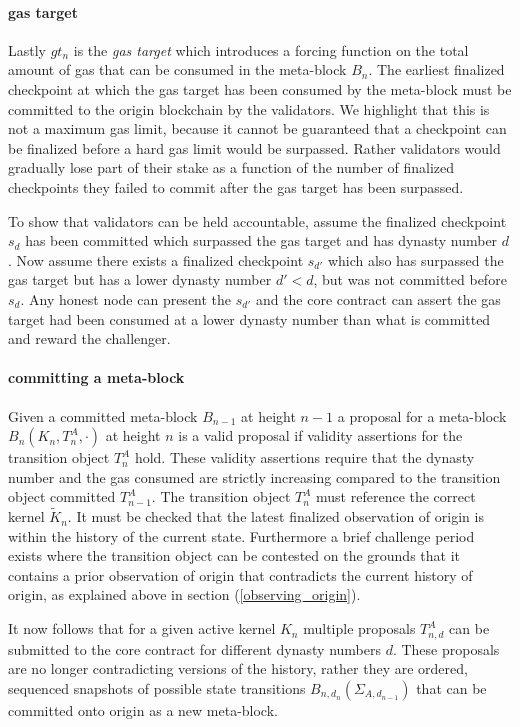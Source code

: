 \documentclass[12pt,a4paper]{article}
\begin{document}
\paragraph{gas target} Lastly $gt_n$ is the \emph{gas target} which introduces a forcing function on the total amount of gas that can be consumed in the meta-block $B_n$.
The earliest finalized checkpoint at which the gas target has been consumed by the meta-block must be committed to the origin blockchain by the validators.
We highlight that this is not a maximum gas limit, because it cannot be guaranteed that a checkpoint can be finalized before a hard gas limit would be surpassed. Rather validators would gradually lose part of their stake as a function of the number of finalized checkpoints they failed to commit after the gas target has been surpassed.

To show that validators can be held accountable, assume the finalized checkpoint $s_d$ has been committed which surpassed the gas target and has dynasty number $d$.
Now assume there exists a finalized checkpoint $s_{d'}$ which also has surpassed the gas target but has a lower dynasty number $d' < d$, but was not committed before $s_d$.
Any honest node can present the $s_{d'}$ and the core contract can assert the gas target had been consumed at a lower dynasty number than what is committed and reward the challenger.

\paragraph{committing a meta-block} Given a committed meta-block $B_{n-1}$ at height $n-1$ a proposal for a meta-block $B_{n}(K_{n}, T^A_{n}, \cdot)$ at height $n$ is a valid proposal if validity assertions for the transition object $T^A_n$ hold.  These validity assertions require that the dynasty number and the gas consumed are strictly increasing compared to the transition object committed $T^A_{n-1}$. The transition object $T^A_n$ must reference the correct kernel $\tilde{K}_n$. It must be checked that the latest finalized observation of origin is within the history of the current state. Furthermore a brief challenge period exists where the transition object can be contested on the grounds that it contains a prior observation of origin that contradicts the current history of origin, as explained above in section (\ref{observing_origin}).

It now follows that for a given active kernel $K_n$ multiple proposals $T^{A}_{n,d}$ can be submitted to the core contract for different dynasty numbers $d$. These proposals are no longer contradicting versions of the history, rather they are ordered, sequenced snapshots of possible state transitions $B_{n,d_{n}}(\Sigma_{A,d_{n-1}})$ that can be committed onto origin as a new meta-block.
\end{document}
